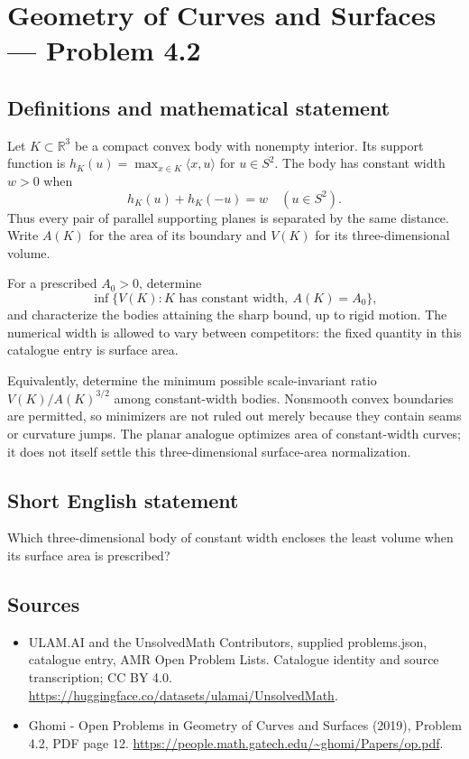 \documentclass[11pt,a4paper]{article}
\begin{document}
\section*{Geometry of Curves and Surfaces — Problem 4.2}\label{statement}

\subsection{Definitions and mathematical statement}
Let $K\subset\mathbb R^3$ be a compact convex body with nonempty
interior. Its support function is
$h_K(u)=\max_{x\in K}\langle x,u\rangle$ for $u\in S^2$.
The body has constant width $w>0$ when
\[
                         h_K(u)+h_K(-u)=w\quad(u\in S^2).
\]
Thus every pair of parallel supporting planes is separated by
the same distance. Write $A(K)$ for the area of its boundary
and $V(K)$ for its three-dimensional volume.

For a prescribed $A_0>0$, determine
\[
       \inf\{V(K):K\text{ has constant width},\ A(K)=A_0\},
\]
and characterize the bodies attaining the sharp bound, up to
rigid motion. The numerical width is allowed to vary between
competitors: the fixed quantity in this catalogue entry is
surface area.

Equivalently, determine the minimum possible scale-invariant
ratio $V(K)/A(K)^{3/2}$ among constant-width bodies. Nonsmooth
convex boundaries are permitted, so minimizers are not ruled
out merely because they contain seams or curvature jumps.
The planar analogue optimizes area of constant-width curves;
it does not itself settle this three-dimensional surface-area
normalization.
\subsection{Short English statement}
Which three-dimensional body of constant width encloses the least
volume when its surface area is prescribed?
\subsection{Sources}
\begin{itemize}
\item[S1] ULAM.AI and the UnsolvedMath Contributors, supplied problems.json, catalogue entry, AMR Open Problem Lists. Catalogue identity and source transcription; CC BY 4.0.
\url{https://huggingface.co/datasets/ulamai/UnsolvedMath}.
\item[S2] Ghomi - Open Problems in Geometry of Curves and Surfaces (2019), Problem 4.2, PDF page 12. 
\url{https://people.math.gatech.edu/~ghomi/Papers/op.pdf}.
\end{itemize}
\end{document}
